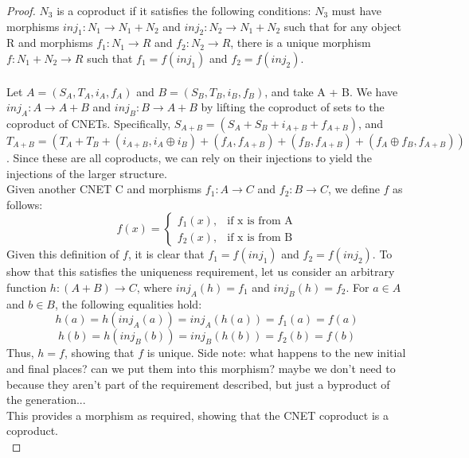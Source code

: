 \begin {proof}
$N_3$ is a coproduct if it satisfies the following conditions: $N_3$ must have morphisms $inj_1: N_1 \rightarrow N_1 + N_2$ and $inj_2: N_2 \rightarrow N_1 + N_2$ such that for any object R and morphisms $f_1: N_1\rightarrow R$ and $f_2: N_2\rightarrow R$, there is a unique morphism $f: N_1 + N_2 \rightarrow R$ such that $f_1 = f(inj_1)$ and $f_2 = f(inj_2)$.\\
\smallskip\\
Let $A = (S_A, T_A, i_A, f_A)$ and $B = (S_B, T_B, i_B, f_B)$, and take A + B. We have $inj_A: A \rightarrow A + B$  and $inj_B: B \rightarrow A + B$ by lifting the coproduct of sets to the coproduct of CNETs. Specifically, $S_{A+B} = (S_A + S_B + i_{A+B} + f_{A+B})$, and $T_{A+B} = (T_A + T_B + (i_{A+B}, i_A \oplus i_B) + (f_A, f_{A+B}) + (f_B,f_{A+B})+ (f_A \oplus f_B, f_{A+B}))$. Since these are all coproducts, we can rely on their injections to yield the injections of the larger structure.\smallskip\\ 
Given another CNET C and morphisms $f_1: A\rightarrow C$ and $f_2: B\rightarrow C$, we define $f$ as follows:\\
  \begin{equation}
    f(x)=
    \begin{cases}
      f_1(x), & \text{if x is from A}\\
      f_2(x), & \text{if x is from B}
    \end{cases}
  \end{equation}
Given this definition of $f$, it is clear that $f_1 = f(inj_1)$ and $f_2 = f(inj_2).$ To show that this satisfies the uniqueness requirement, let us consider an arbitrary function $h : (A+B) \rightarrow C$, where $inj_A(h) = f_1$ and $inj_B(h) = f_2$. For $a\in A$ and $b\in B$, the following equalities hold:\\
\begin{equation}
h(a) = h(inj_A(a)) = inj_A(h(a)) = f_1(a) = f(a)
\end {equation}
\begin{equation}
h(b) = h(inj_B(b)) = inj_B(h(b)) = f_2(b) = f(b)
\end{equation}
Thus, $h = f$, showing that $f$ is unique. 
Side note: what happens to the new initial and final places? can we put them into this morphism? maybe we don't need to because they aren't part of the requirement described, but just a byproduct of the generation...\\
This provides a morphism as required, showing that the CNET coproduct is a coproduct.  
\bigskip\\
\end{proof}
